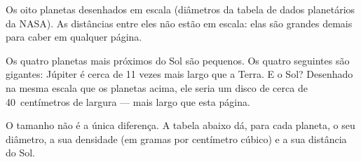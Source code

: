 \begin{omfigure}
\gsixsizes
{}

{\small Os oito planetas desenhados em escala (diâmetros da tabela de dados
planetários da NASA). As distâncias entre eles não estão em escala: elas são
grandes demais para caber em qualquer página.}
\end{omfigure}

Os quatro planetas mais próximos do Sol são pequenos. Os quatro seguintes
são gigantes: Júpiter é cerca de 11 vezes mais largo que a Terra. E o Sol?
Desenhado na mesma escala que os planetas acima, ele seria um disco de
cerca de 40~centímetros de largura --- mais largo que esta página.

O tamanho não é a única diferença. A tabela abaixo dá, para cada planeta, o
seu diâmetro, a sua densidade (em gramas por centímetro cúbico) e a sua
distância do Sol.

